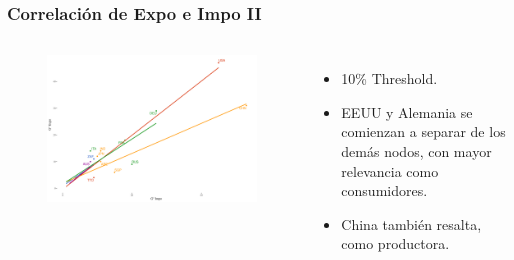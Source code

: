 \documentclass[professionalfont,fleqn]{beamer}
\begin{document}
			\begin{frame}
		\frametitle{Correlación de Expo e Impo II}
		\begin{columns}[c] %
			
		
		\begin{flushleft}
			\begin{figure}
				\includegraphics[width=\linewidth]{corr_grados_2011_10_pcnt}
			\end{figure}
		\end{flushleft}
		
		
		\begin{itemize}
			\item 10\% Threshold.
			\item EEUU y Alemania se comienzan a separar de los demás nodos, con mayor relevancia como consumidores.
			\item China también resalta, como productora.
		\end{itemize}
		\end{columns}
	\end{frame}
\end{document}
